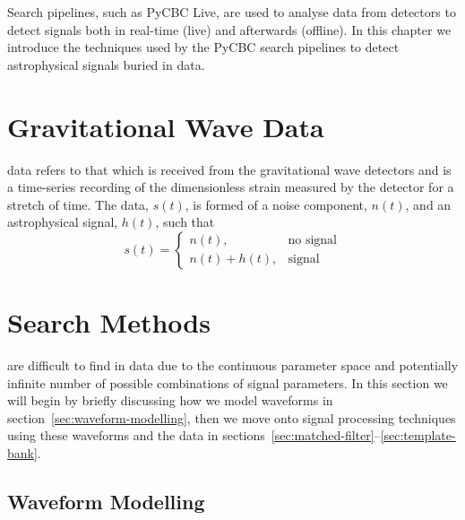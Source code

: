 %
Search pipelines, such as PyCBC Live, are used to analyse data from \gw detectors to detect \gw signals both in real-time (live) and afterwards (offline). In this chapter we introduce the techniques used by the PyCBC search pipelines to detect astrophysical signals buried in \gw data.

\section{\label{}Gravitational Wave Data}

\Gw data refers to that which is received from the gravitational wave detectors and is a time-series recording of the dimensionless strain measured by the detector for a stretch of time. The data, $s(t)$, is formed of a noise component, $n(t)$, and an astrophysical signal, $h(t)$, such that
%
\begin{equation}
    s(t) =
    \begin{cases}
        n(t), & \text{no signal} \\
        n(t) + h(t), & \text{signal}
    \end{cases}
\end{equation}

\section{\label{}Search Methods}
\Gws are difficult to find in \gw data due to the continuous parameter space and potentially infinite number of possible combinations of \gw signal parameters. In this section we will begin by briefly discussing how we model \gw waveforms in section~\ref{sec:waveform-modelling}, then we move onto signal processing techniques using these waveforms and the data in sections~\ref{sec:matched-filter}--\ref{sec:template-bank}.

\subsection{\label{sec:waveform-modelling}Waveform Modelling}


